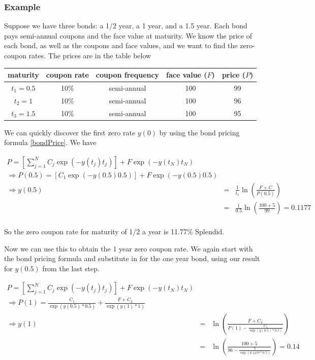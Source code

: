 \subsubsection{Example} Suppose we have three bonds: a 1/2 year, a 1 year, and a 1.5 year. Each bond pays semi-annual coupons and the face value at maturity. We know the price of each bond, as well as the coupons and face values, and we want to find the zero-coupon rates. The prices are in the table below

\begin{tabular}{|c|c|c|c|c|}
  \hline
  maturity & coupon rate & coupon frequency & face value ($F$) & price ($P$) \\
  \hline
  $t_1 = 0.5$ & 10\%  & semi-annual & 100 & 99 \\
  $t_2 = 1$ & 10\%  & semi-annual & 100 & 96 \\
  $t_3 = 1.5$ & 10\% & semi-annual & 100 & 95 \\
  \hline
\end{tabular}

We can quickly discover the first zero rate $y(0)$ by using the bond pricing formula \ref{bondPrice}. We have

\begin{eqnarray*}
P = \left[\sum_{j=1}^N C_j\exp(-y(t_j)t_j)\right] + F \exp(-y(t_N)t_N) \\
\Rightarrow P(0.5) = \left[C_1\exp(-y(0.5)0.5)\right] + F \exp(-y(0.5)0.5) \\
\Rightarrow y(0.5) &=& \frac{1}{t_1}\ln\left(\frac{F+C}{P(0.5)}\right) \\
&=& \frac{1}{0.5}\ln\left(\frac{100+5}{99}\right) = 0.1177 \\
\end{eqnarray*}

So the zero coupon rate for maturity of 1/2 a year is 11.77\% Splendid.

 Now we can use this to obtain the 1 year zero coupon rate. We again start with the bond pricing formula and substitute in for the one year bond, using our result for $y(0.5)$ from the last step.

\begin{eqnarray*}
P = \left[\sum_{j=1}^N C_j\exp(-y(t_j)t_j)\right] + F \exp(-y(t_N)t_N)\\
\Rightarrow P(1) = \frac{C_1}{\exp(y(0.5)*0.5)} +\frac{F+C_2}{\exp(y(1)*1)}\\
\Rightarrow y(1) &=& \ln \left(\frac{F+C_2}{P(1)-\frac{C_1}{\exp(y(0.5)*0.5)}} \right)\\
 &=& \ln \left(\frac{100+5}{96-\frac{5}{\exp(0.1177*0.5)}} \right) = 0.14
\end{eqnarray*}

